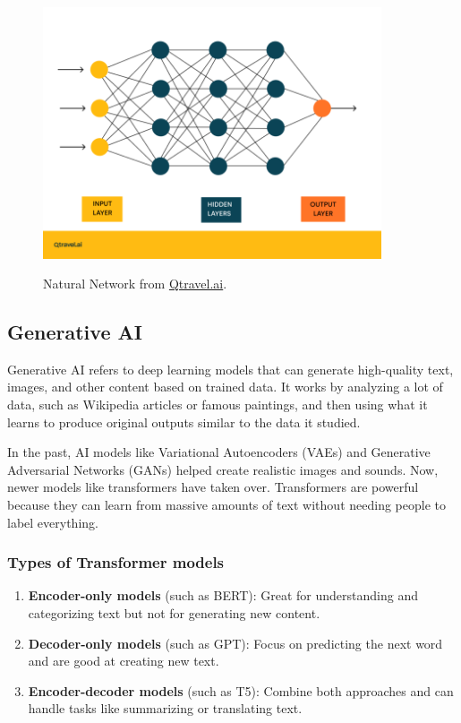 \documentclass[12pt,oneside,openright,a4paper]{cpe-english-project}
\begin{document}
\begin{figure}[H]
\centering
\includegraphics[width=10cm]{./assets/Natural-Network.png}
\label{fig:figure-2.3}
\caption{Natural Network from 
\href{https://www.qtravel.ai/wp-content/uploads/2023/07/sieci-neuronowe-grafika-768x570.png}{Qtravel.ai}.}
\end{figure}

\subsection{Generative AI} Generative AI refers to deep learning models that can generate high-quality text, images, and other content based on trained data.  It works by analyzing a lot of data, such as Wikipedia articles or famous paintings, and then using what it learns to produce original outputs similar to the data it studied. \par
In the past, AI models like Variational Autoencoders (VAEs) and Generative Adversarial Networks (GANs) helped create realistic images and sounds. Now, newer models like transformers have taken over. Transformers are powerful because they can learn from massive amounts of text without needing people to label everything.

\subsubsection{Types of Transformer models}
\begin{enumerate}
	\item \textbf{Encoder-only models} (such as BERT): Great for understanding and categorizing text but not for generating new content.
	\item \textbf{Decoder-only models} (such as GPT): Focus on predicting the next word and are good at creating new text.
	\item \textbf{Encoder-decoder models} (such as T5): Combine both approaches and can handle tasks like summarizing or translating text.
\end{enumerate}
\end{document}

